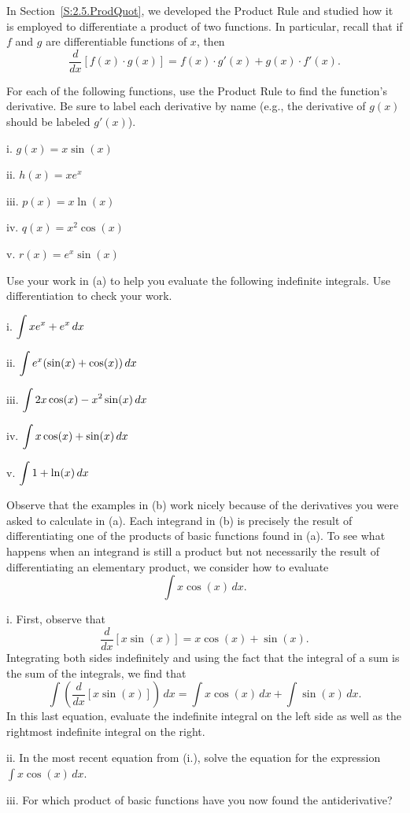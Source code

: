 \begin{pa} \label{PA:5.1}
In Section~\ref{S:2.5.ProdQuot}, we developed the Product Rule and studied how it is employed to differentiate a product of two functions.  In particular, recall that if $f$ and $g$ are differentiable functions of $x$, then
$$\frac{d}{dx} \left[ f(x) \cdot g(x)  \right] = f(x) \cdot g'(x) + g(x) \cdot f'(x).$$ 
\ba
	\item For each of the following functions, use the Product Rule to find the function's derivative.  Be sure to label each derivative by name (e.g., the derivative of $g(x)$ should be labeled $g'(x)$).
	\be
		\item[i.] $g(x) = x\sin(x)$
		\item[ii.] $h(x) = xe^x$
		\item[iii.] $p(x) = x\ln(x)$
		\item[iv.] $q(x) = x^2 \cos(x)$
		\item[v.] $r(x) = e^x \sin(x)$
	\ee
	\item Use your work in (a) to help you evaluate the following indefinite integrals.  Use differentiation to check your work.
	\be
		\item[i.] $\displaystyle \int xe^x + e^x \, dx$
		\item[ii.] $\displaystyle \int e^x(\sin(x) + \cos(x)) \, dx$
		\item[iii.] $\displaystyle \int 2x\cos(x) - x^2 \sin(x) \, dx$
		\item[iv.] $\displaystyle \int x\cos(x) + \sin(x) \, dx$
		\item[v.] $\displaystyle \int 1 + \ln(x) \, dx$
	\ee
	\item Observe that the examples in (b) work nicely because of the derivatives you were asked to calculate in (a).  Each integrand in (b) is precisely the result of differentiating one of the products of basic functions found in (a).  To see what happens when an integrand is still a product but not necessarily the result of differentiating an elementary product, we consider how to evaluate 
	$$\int x\cos(x) \, dx.$$
	\be
		\item[i.] First, observe that 
		$$\frac{d}{dx} \left[ x\sin(x) \right] = x\cos(x) + \sin(x).$$
		Integrating both sides indefinitely and using the fact that the integral of a sum is the sum of the integrals, we find that
		$$\int \left(\frac{d}{dx} \left[ x\sin(x) \right] \right) \, dx = \int  x\cos(x) \, dx +  \int \sin(x) \, dx.$$
		In this last equation, evaluate the indefinite integral on the left side as well as the rightmost indefinite integral on the right.
		\item[ii.] In the most recent equation from (i.), solve the equation for the expression $\int x \cos(x) \, dx$.
		\item[iii.] For which product of basic functions have you now found the antiderivative?
	\ee
\ea
\end{pa} 
\afterpa